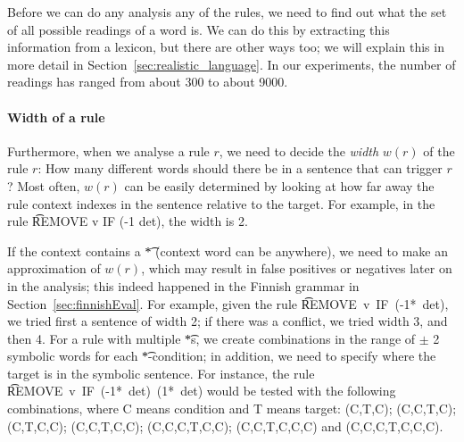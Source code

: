 
Before we can do any analysis any of the rules, we need to find out
what the set of all possible readings of a word is. We can do this by
extracting this information from a lexicon, but there are other ways
too; we will explain this in more detail in
Section~\ref{sec:realistic_language}. In our experiments, the number
of readings has ranged from about 300 to about 9000.

\paragraph{Width of a rule}
Furthermore, when we analyse a rule $r$, we need to decide the {\em width} $w(r)$ of the rule $r$: How many different words should there be in a sentence that can trigger $r$? Most often, $w(r)$ can be easily determined by looking at how far away the rule context indexes in the sentence relative to the target. For example, in the rule \t{REMOVE v IF (-1 det)}, the width is 2.

If the context contains a \t{*} (context word can be anywhere),
we need to make an approximation of $w(r)$, which may result in false positives or negatives later on in the analysis; this indeed happened in the Finnish grammar in Section~\ref{sec:finnishEval}. %
For example, given the rule \t{REMOVE~v~IF~(-1*~det)}, 
we tried first a sentence of width 2; if there was a conflict, we tried width 3, and then 4. For a rule with multiple \t{*}s, we create combinations in the range of $\pm$ 2 symbolic words for each \t{*}-condition; 
in addition, we need to specify where the target is in the symbolic sentence. 
For instance, the rule \t{REMOVE~v~IF~(-1*~det)~(1*~det)} would be tested 
with the following combinations, where C means condition and T means target:
(C,T,C); 
(C,C,T,C); 
(C,T,C,C); 
(C,C,T,C,C); 
(C,C,C,T,C,C); 
(C,C,T,C,C,C) and
(C,C,C,T,C,C,C).



